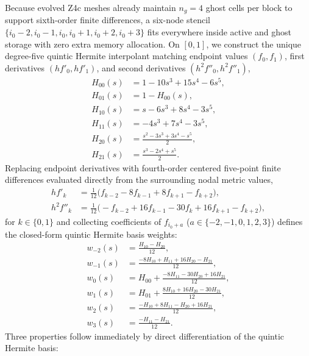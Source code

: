 Because evolved Z4c meshes already maintain $n_g = 4$ ghost cells per block to support sixth-order finite differences, a six-node stencil $\{i_0-2, i_0-1, i_0, i_0+1, i_0+2, i_0+3\}$ fits everywhere inside active and ghost storage with zero extra memory allocation. On $[0, 1]$, we construct the unique degree-five quintic Hermite interpolant matching endpoint values $(f_0, f_1)$, first derivatives $(h f'_0, h f'_1)$, and second derivatives $(h^2 f''_0, h^2 f''_1)$,
\begin{align}\label{eq:quintic_basis}
H_{00}(s) &= 1 - 10s^3 + 15s^4 - 6s^5, \nonumber\\
H_{01}(s) &= 1 - H_{00}(s), \nonumber\\
H_{10}(s) &= s - 6s^3 + 8s^4 - 3s^5, \nonumber\\
H_{11}(s) &= -4s^3 + 7s^4 - 3s^5, \nonumber\\
H_{20}(s) &= \frac{s^2 - 3s^3 + 3s^4 - s^5}{2}, \nonumber\\
H_{21}(s) &= \frac{s^3 - 2s^4 + s^5}{2}.
\end{align}
Replacing endpoint derivatives with fourth-order centered five-point finite differences evaluated directly from the surrounding nodal metric values,
\begin{align}\label{eq:quintic_endpoint_derivs}
h f'_{k} &= \frac{1}{12}\bigl(f_{k-2} - 8f_{k-1} + 8f_{k+1} - f_{k+2}\bigr), \nonumber\\
h^2 f''_{k} &= \frac{1}{12}\bigl(-f_{k-2} + 16f_{k-1} - 30f_k + 16f_{k+1} - f_{k+2}\bigr),
\end{align}
for $k \in \{0, 1\}$ and collecting coefficients of $f_{i_0+a}$ ($a \in \{-2,-1,0,1,2,3\}$) defines the closed-form quintic Hermite basis weights:
\begin{align}\label{eq:quintic_weights}
w_{-2}(s) &= \frac{H_{10} - H_{20}}{12}, \nonumber\\
w_{-1}(s) &= \frac{-8H_{10} + H_{11} + 16H_{20} - H_{21}}{12}, \nonumber\\
w_{0}(s) &= H_{00} + \frac{-8H_{11} - 30H_{20} + 16H_{21}}{12}, \nonumber\\
w_{1}(s) &= H_{01} + \frac{8H_{10} + 16H_{20} - 30H_{21}}{12}, \nonumber\\
w_{2}(s) &= \frac{-H_{10} + 8H_{11} - H_{20} + 16H_{21}}{12}, \nonumber\\
w_{3}(s) &= \frac{-H_{11} - H_{21}}{12}.
\end{align}
Three properties follow immediately by direct differentiation of the quintic Hermite basis:
